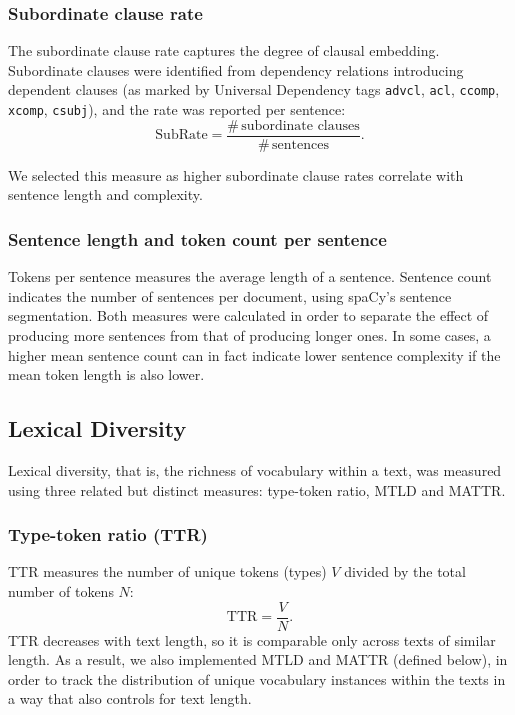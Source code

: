 \documentclass[thesis]{cluu}
\begin{document}
\subsubsection{Subordinate clause rate}
The subordinate clause rate captures the degree of clausal embedding. Subordinate
clauses were identified from dependency relations introducing dependent clauses
(as marked by Universal Dependency tags \texttt{advcl}, \texttt{acl}, \texttt{ccomp}, \texttt{xcomp}, \texttt{csubj}), and
the rate was reported per sentence:
\begin{equation}
\mathrm{SubRate} = \frac{\#\,\text{subordinate clauses}}{\#\,\text{sentences}}.
\end{equation}

We selected this measure as higher subordinate clause rates correlate with sentence length and complexity.

\subsubsection{Sentence length and token count per sentence}
Tokens per sentence measures the average length of a sentence. Sentence count indicates the number of sentences per document, using spaCy's sentence segmentation. Both measures were calculated in order to separate the effect of producing more sentences from that of producing longer ones. In some cases, a higher mean sentence count can in fact indicate lower sentence complexity if the mean token length is also lower.

\subsection{Lexical Diversity}
Lexical diversity, that is, the richness of vocabulary within a text, was measured using three related but distinct measures: type-token ratio, MTLD and MATTR.

\subsubsection{Type-token ratio (TTR)}
TTR measures the number of unique tokens (types) $V$ divided by the
total number of tokens $N$:
\begin{equation}
\mathrm{TTR} = \frac{V}{N}.
\end{equation}
TTR decreases with text length, so it is comparable only across
texts of similar length. As a result, we also implemented MTLD and MATTR (defined below), in order to track the distribution of unique vocabulary instances within the texts in a way that also controls for text length.
\end{document}
